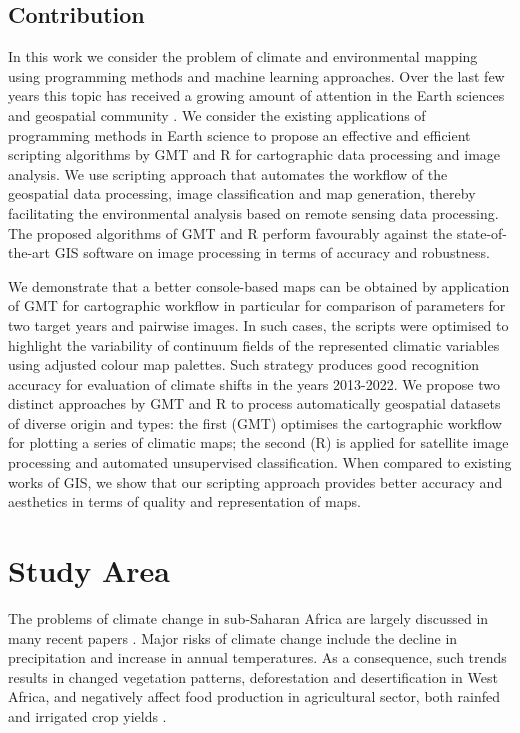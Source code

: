 \documentclass[atmosphere,article,submit,pdftex,moreauthors]{Definitions/mdpi}
\begin{document}
\subsection{Contribution}

In this work we consider the problem of climate and environmental mapping using programming methods and machine learning approaches. Over the last few years this topic has received a growing amount of attention in the Earth sciences and geospatial community \cite{4779429,DIMOBE2022100768,land12010261}. We consider the existing applications of programming methods in Earth science to propose an effective and efficient scripting algorithms by GMT and R for cartographic data processing and image analysis. We use scripting approach that automates the workflow of the geospatial data processing, image classification and map generation, thereby facilitating the environmental analysis based on remote sensing data processing. The proposed algorithms of GMT and R perform favourably against the state-of-the-art GIS software on image processing in terms of accuracy and robustness. 

We demonstrate that a better console-based maps can be obtained by application of GMT for cartographic workflow in particular for comparison of parameters for two target years and pairwise images. In such cases, the scripts were optimised to highlight the variability of continuum fields of the represented climatic variables using adjusted colour map palettes. Such strategy produces good recognition accuracy for evaluation of climate shifts in the years 2013-2022. We propose two distinct approaches by GMT and R  to process automatically geospatial datasets of diverse origin and types: the first (GMT) optimises the cartographic workflow for plotting a series of climatic maps; the second (R) is applied for satellite image processing and automated unsupervised classification. When compared to existing works of GIS, we show that our scripting approach provides better accuracy and aesthetics in terms of quality and representation of maps.

\section{Study Area}

The problems of climate change in sub-Saharan Africa are largely discussed in many recent papers \cite{AYANLADE2022100311,EMEDIEGWU2022105967,WAONGO201523,AZIBO2015126,ASCOTT2022128107,WEBBER2014161,WAHA2013130,olsson1993desertification}. Major risks of climate change include the decline in precipitation and increase in annual temperatures. As a consequence, such trends results in changed vegetation patterns, deforestation and desertification in West Africa, and negatively affect food production in agricultural sector, both rainfed and irrigated crop yields \cite{CALZADILLA2013150,WAONGO201523}. 
\end{document}
